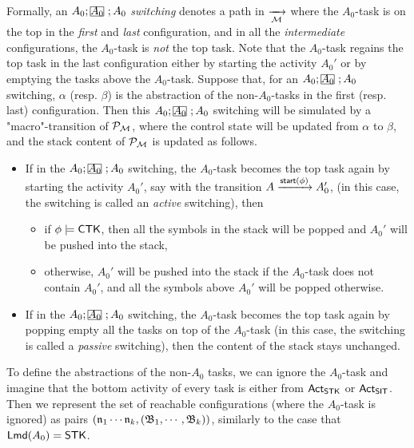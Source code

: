 Formally, an $A_0;\mhcancel{A_0};A_0$ \emph{switching} denotes a path in $\xrightarrow[{\mathcal{M} }]{}$ where the $A_0$-task is on the top in the \emph{first} and \emph{last} configuration, and in all the \emph{intermediate} configurations, the $A_0$-task is \emph{not} the top task. 
%
Note that the $A_0$-task regains the top task in the last configuration either by starting the activity $A_0'$ or by emptying the tasks above the $A_0$-task. Suppose that, for an $A_0;\mhcancel{A_0};A_0$ switching, $\alpha$ (resp. $\beta$) is the abstraction of the non-$A_0$-tasks in the first (resp. last) configuration. 
Then this $A_0;\mhcancel{A_0};A_0$ switching will be simulated by a "macro"-transition of ${\mathcal{P} }_{{\mathcal{M} }}$, where the control state will be updated from $\alpha$ to $\beta$, and the stack content of ${\mathcal{P} }_{{\mathcal{M} }}$ is updated as follows. 
\begin{itemize}
    \item If in the $A_0; \mhcancel{A_0}; A_0$ switching, the $A_0$-task becomes the top task again by starting the activity $A_0'$, say with the transition $A\xrightarrow{{\mathsf{start} }(\phi)}A_0'$, (in this case, the switching is called an \emph{active} switching), then
    \begin{itemize}
        \item if $\phi \models {\sf CTK}$, then all the symbols in the stack will be popped and $A_0'$ will be pushed into the stack,
        \item otherwise, $A_0'$ will be pushed into the stack if the $A_0$-task does not contain $A_0'$, and all the symbols above $A_0'$ will be popped otherwise.
    \end{itemize}
%
    \item If in the $A_0; \mhcancel{A_0}; A_0$ switching, the $A_0$-task becomes the top task again by popping empty all the tasks on top of the $A_0$-task (in this case, the switching is called a \emph{passive} switching), then the content of the stack stays unchanged.
%        
\end{itemize}

To define the abstractions of the non-$A_0$ tasks, we can ignore the $A_0$-task and imagine that the bottom activity of every task is either from ${\sf Act}_{{\sf STK}}$ or ${\sf Act}_{{\sf SIT}}$.  Then we represent the set of reachable configurations (where the $A_0$-task is ignored) as pairs $(\mathfrak{n}_1 \cdots \mathfrak{n}_k, ({\mathfrak{B} }_1, \cdots, {\mathfrak{B} }_k))$, similarly to the case that ${\sf Lmd}(A_0) = {\sf STK}$. 

